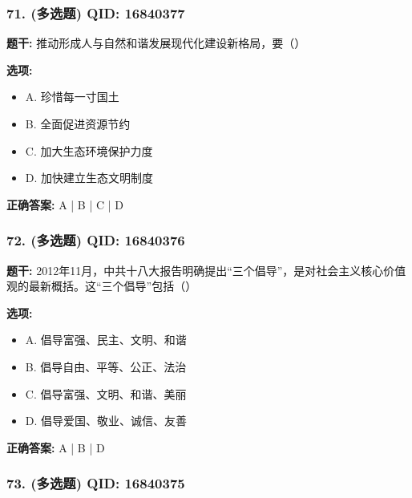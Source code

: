 \documentclass[12pt,UTF8]{ctexart}
\begin{document}
\subsubsection*{71. (多选题) \small QID: 16840377}

\textbf{题干:}
推动形成人与自然和谐发展现代化建设新格局，要（）

\textbf{选项:}
\begin{itemize}[leftmargin=*]

  \item A. 珍惜每一寸国土

  \item B. 全面促进资源节约

  \item C. 加大生态环境保护力度

  \item D. 加快建立生态文明制度

\end{itemize}

\textbf{正确答案:}
A | B | C | D

\vspace{0.3em}\hrulefill\vspace{0.7em}

\subsubsection*{72. (多选题) \small QID: 16840376}

\textbf{题干:}
2012年11月，中共十八大报告明确提出“三个倡导”，是对社会主义核心价值观的最新概括。这“三个倡导”包括（）

\textbf{选项:}
\begin{itemize}[leftmargin=*]

  \item A. 倡导富强、民主、文明、和谐

  \item B. 倡导自由、平等、公正、法治

  \item C. 倡导富强、文明、和谐、美丽

  \item D. 倡导爱国、敬业、诚信、友善

\end{itemize}

\textbf{正确答案:}
A | B | D

\vspace{0.3em}\hrulefill\vspace{0.7em}

\subsubsection*{73. (多选题) \small QID: 16840375}
\end{document}
